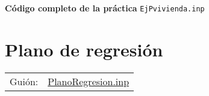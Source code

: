 \documentclass[11pt]{article}
\begin{document}
\vspace{10pt}
\noindent
\textbf{Código completo de la práctica} \texttt{EjPvivienda.inp}
\vspace{10pt}

\clearpage

\section{Plano de regresión}
\label{sec:orgbccd1a1}
\begin{center}
\begin{tabular}{ll}
Guión: & \href{https://github.com/mbujosab/Ectr/tree/master/Practicas/Gretl/scripts/PlanoRegresion.inp}{PlanoRegresion.inp}\\[0pt]
\end{tabular}
\end{center}
\end{document}
